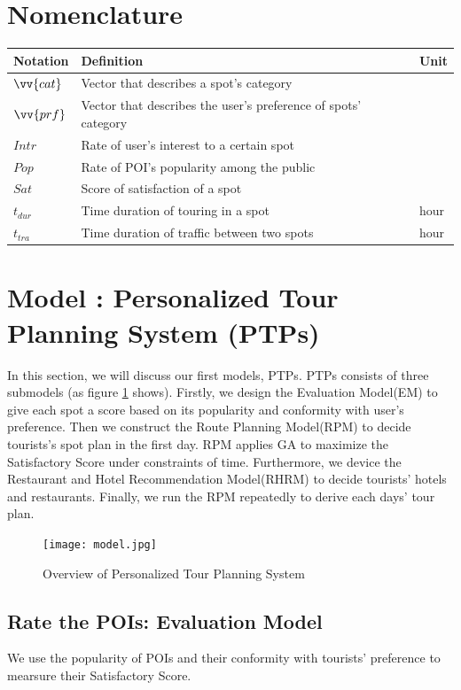 \documentclass{mcmthesis}
\newcommand{\RNum}[1]{\uppercase\expandafter{\romannumeral #1\relax}}
\begin{document}
\section{Nomenclature}
  \begin{tabular}{lll}    %
    \toprule
    Notation & Definition & Unit \\
    \midrule
    $\vv{cat}$ & Vector that describes a spot's category & \\
    $\vv{prf}$ & Vector that describes the user's preference of spots' category & \\
    $Intr$ & Rate of user's interest to a certain spot & \\
    $Pop$ & Rate of POI's popularity among the public & \\
    $Sat$ & Score of satisfaction of a spot & \\
    $t_{dur}$ & Time duration of touring in a spot & hour \\
    $t_{tra}$ & Time duration of traffic between two spots & hour \\
    \bottomrule
  \end{tabular}

\section{Model \RNum{1}: Personalized Tour Planning System (PTPs)} \label{section:model1}
  In this section, we will discuss our first models, PTPs. PTPs consists of three submodels (as figure \ref{fig:model} shows). Firstly, we design the Evaluation Model(EM) to give each spot a score based on its popularity and conformity with user's preference. Then we construct the Route Planning Model(RPM) to decide tourists's spot plan in the first day. RPM applies GA to maximize the Satisfactory Score under constraints of time. Furthermore, we device the Restaurant and Hotel Recommendation Model(RHRM) to decide tourists' hotels and restaurants. Finally, we run the RPM repeatedly to derive each days' tour plan.
  \begin{figure}[ht]
    \centering
    \texttt{[image: model.jpg]}
    \caption{Overview of Personalized Tour Planning System}
    \label{fig:model}
  \end{figure}
\subsection{Rate the POIs: Evaluation Model}
  We use the popularity of POIs and their conformity with tourists' preference to mearsure their Satisfactory Score.
  
\end{document}
